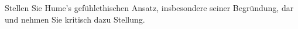 \documentclass{article}
\begin{document}
\begin{tcolorbox}[colback=white!20,colframe=gray!75!black,title=Arbeitsauftrag:]
Stellen Sie Hume's gefühlethischen Ansatz, insbesondere seiner Begründung, dar
und nehmen Sie kritisch dazu Stellung.
\end{tcolorbox}


\end{document}
